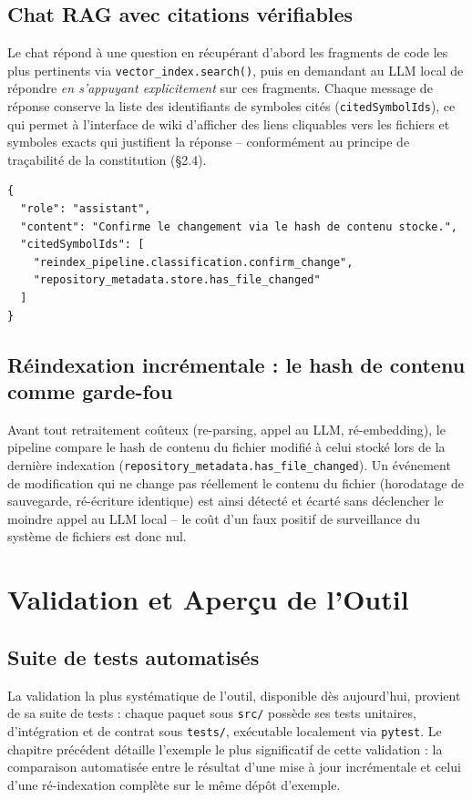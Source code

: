 \documentclass[12pt,a4paper]{report}
\begin{document}
\section{Chat RAG avec citations vérifiables}
Le chat répond à une question en récupérant d'abord les fragments de code les plus
pertinents via \texttt{vector\_index.search()}, puis en demandant au LLM local de
répondre \emph{en s'appuyant explicitement} sur ces fragments. Chaque message de
réponse conserve la liste des identifiants de symboles cités
(\texttt{citedSymbolIds}), ce qui permet à l'interface de wiki d'afficher des liens
cliquables vers les fichiers et symboles exacts qui justifient la réponse --
conformément au principe de traçabilité de la constitution (§2.4).

\begin{lstlisting}[caption={Structure simplifiée d'un message de réponse du chat, avec citations}]
{
  "role": "assistant",
  "content": "Confirme le changement via le hash de contenu stocke.",
  "citedSymbolIds": [
    "reindex_pipeline.classification.confirm_change",
    "repository_metadata.store.has_file_changed"
  ]
}
\end{lstlisting}

\section{Réindexation incrémentale : le hash de contenu comme garde-fou}
Avant tout retraitement coûteux (re-parsing, appel au LLM, ré-embedding), le
pipeline compare le hash de contenu du fichier modifié à celui stocké lors de la
dernière indexation (\texttt{repository\_metadata.has\_file\_changed}). Un
événement de modification qui ne change pas réellement le contenu du fichier
(horodatage de sauvegarde, ré-écriture identique) est ainsi détecté et écarté sans
déclencher le moindre appel au LLM local -- le coût d'un faux positif de
surveillance du système de fichiers est donc nul.

\newpage

\chapter{Validation et Aperçu de l'Outil}

\section{Suite de tests automatisés}
La validation la plus systématique de l'outil, disponible dès aujourd'hui, provient
de sa suite de tests : chaque paquet sous \texttt{src/} possède ses tests unitaires,
d'intégration et de contrat sous \texttt{tests/}, exécutable localement via
\texttt{pytest}. Le chapitre précédent détaille l'exemple le plus significatif de
cette validation : la comparaison automatisée entre le résultat d'une mise à jour
incrémentale et celui d'une ré-indexation complète sur le même dépôt d'exemple.
\end{document}
